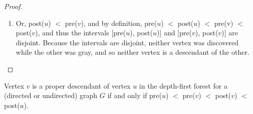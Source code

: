 \begin{proof}
\begin{enumerate}
	  \item Or, post($u$) $<$ pre($v$), and by definition, pre($u$) $<$ post($u$) $<$ pre(v) $<$ post($v$), and thus the intervals [pre($u$), post($u$)] and [pre($v$), post($v$)] are disjoint. Because the intervals are disjoint, neither vertex was discovered while the other was gray, and so neither vertex is a descendant of the other.
	\end{enumerate}
\end{proof}

\begin{corollary}
  Vertex $v$ is a proper descendant of vertex $u$ in the depth-first forest for a (directed or undirected) graph $G$ if and only if pre($u$) $<$ pre($v$) $<$ post($v$) $<$ post($u$).
\end{corollary}
  



%
%





